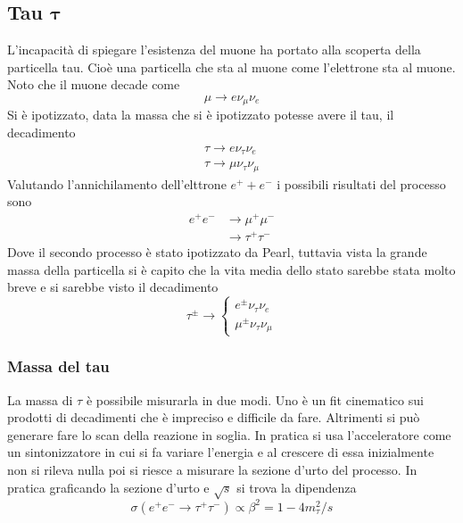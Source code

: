 \documentclass[12pt]{book}
\begin{document}
\subsection{Tau $\mathbf{\tau}$}
L'incapacità di spiegare l'esistenza del muone ha portato alla scoperta della particella tau. Cioè una particella che sta al muone come l'elettrone sta al muone. Noto che il muone decade come
\begin{equation}
	\mu \rightarrow e \nu_\mu \nu_e
\end{equation}
Si è ipotizzato, data la massa che si è ipotizzato potesse avere il tau, il decadimento
\begin{gather}
	\tau \rightarrow e \nu _ \tau \nu_e\\
	\tau \rightarrow \mu \nu_\tau \nu _\mu
\end{gather}
Valutando l'annichilamento dell'elttrone $e^++e^-$ i possibili risultati del processo sono 
\begin{align*}
	e^+e^- &\rightarrow \mu^+ \mu^- \\
	&\rightarrow \tau^+ \tau^-
\end{align*}
Dove il secondo processo è stato ipotizzato da Pearl, tuttavia vista la grande massa della particella si è capito che la vita media dello stato sarebbe stata molto breve e si sarebbe visto il decadimento
\begin{equation}
	\tau^\pm \rightarrow  \begin{cases}e^\pm \nu_\tau \nu_e  \\ \mu^\pm \nu_\tau \nu_\mu\end{cases}   
\end{equation}

\subsubsection{Massa del tau}
La massa di $\tau$ è possibile misurarla in due modi. Uno è un fit cinematico sui prodotti di decadimenti che è impreciso e difficile da fare. Altrimenti si può generare fare lo scan della reazione in soglia. In pratica si usa l'acceleratore come un sintonizzatore in cui si fa variare l'energia e al crescere di essa inizialmente non si rileva nulla poi si riesce a misurare la sezione d'urto del processo. In pratica graficando la sezione d'urto e $\sqrt{s}$ si trova la dipendenza 
\begin{equation}
	\sigma (e^+e^- \rightarrow \tau^+ \tau^- ) \propto \beta^2 = 1 - 4 m_\tau^2/s
\end{equation}
\end{document}
